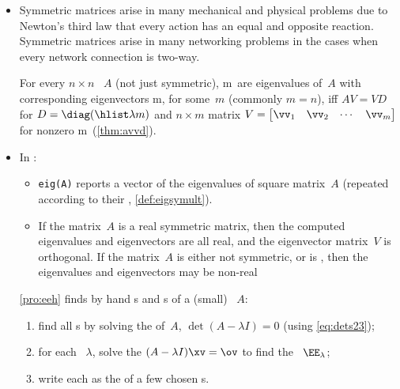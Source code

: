 \begin{itemize}
\item Symmetric matrices arise in many mechanical and physical problems due to Newton's third law that every action has an equal and opposite reaction.
Symmetric matrices arise in many networking problems in the cases when every network connection is two-way. 

\itemme For every \(n\times n\) ~\(A\) (not just symmetric),
\hlist\lambda m\ are eigenvalues of~\(A\) with corresponding eigenvectors \hlist\vv m, for some~\(m\) (commonly \(m=n\)), iff \(AV=VD\) for  \(D=\diag(\hlist\lambda m)\) and \(n\times m\) matrix \(V=\begin{bmatrix} \vv_1&\vv_2&\cdots&\vv_m \end{bmatrix}\) for nonzero \hlist\vv m\ (\cref{thm:avvd}).

\item In \script:
\begin{itemize}
\itemhi {}\verb|[V,D]=eig(A)| computes eigenvectors and the eigenvalues of the  \(n\times n\) ~\(A\).
\begin{itemize}
\item The \(n\)~s of~\(A\) (repeated according to their , \cref{def:eigsymult}) form the diagonal of \(n\times n\) square matrix \(D=\diag(\hlist\lambda n)\).
\item Corresponding to the \(j\)th~eigenvalue~\(\lambda_j\), the \(j\)th~column of \(n\times n\) square matrix~\(V\) is an  (of unit length).
\end{itemize}
\item \verb|eig(A)| reports a vector of the eigenvalues of square matrix~\(A\) (repeated according to their  , \cref{def:eigsymult}).

\item If the matrix~\(A\) is a real symmetric matrix, then the computed eigenvalues and eigenvectors are all real, and the eigenvector matrix~\(V\) is orthogonal.
If the matrix~\(A\) is either not symmetric, or is , then the eigenvalues and eigenvectors may be non-real 

\end{itemize}


\itemme \cref{pro:eeh} finds by hand s and s of a (small) ~\(A\):
\begin{enumerate}
\item find all s by solving the  of~\(A\), \(\det(A-\lambda I)=0\) (using \eqref{eq:dets23});
\item for each ~\(\lambda\), solve the  \((A-\lambda I)\xv=\ov\) to find the ~\(\EE_\lambda\);
\item write each  as the  of a few chosen s.
\end{enumerate}






\end{itemize}
